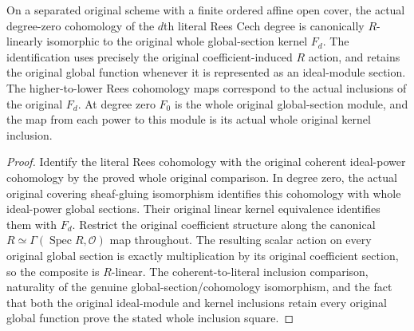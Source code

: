 \begin{lemma}
\label{lem:fibre-global-kernel-degree-zero-cohomology}
\leanok
On a separated original scheme with a finite ordered affine open
cover, the actual degree-zero cohomology of the $d$th literal Rees
Cech degree is canonically $R$-linearly isomorphic to the original
whole global-section kernel $F_d$. The identification uses precisely
the original coefficient-induced $R$ action, and retains the original
global function whenever it is represented as an ideal-module section.
The higher-to-lower Rees cohomology maps correspond to the actual
inclusions of the original $F_d$. At degree zero $F_0$ is the
whole original global-section module, and the map from each power
to this module is its actual whole original kernel inclusion.
\end{lemma}
\begin{proof}
Identify the literal Rees cohomology with the original coherent
ideal-power cohomology by the proved whole original comparison. In
degree zero, the actual original covering sheaf-gluing isomorphism
identifies this cohomology with whole ideal-power global sections.
Their original linear kernel equivalence identifies them with $F_d$.
Restrict the original coefficient structure along the canonical
$R\simeq\Gamma(\operatorname{Spec}R,\mathcal O)$ map throughout. The
resulting scalar action on every original global section is exactly
multiplication by its original coefficient section, so the composite
is $R$-linear. The coherent-to-literal inclusion comparison, naturality
of the genuine global-section/cohomology isomorphism, and the fact that
both the original ideal-module and kernel inclusions retain every
original global function prove the stated whole inclusion square.
\end{proof}
